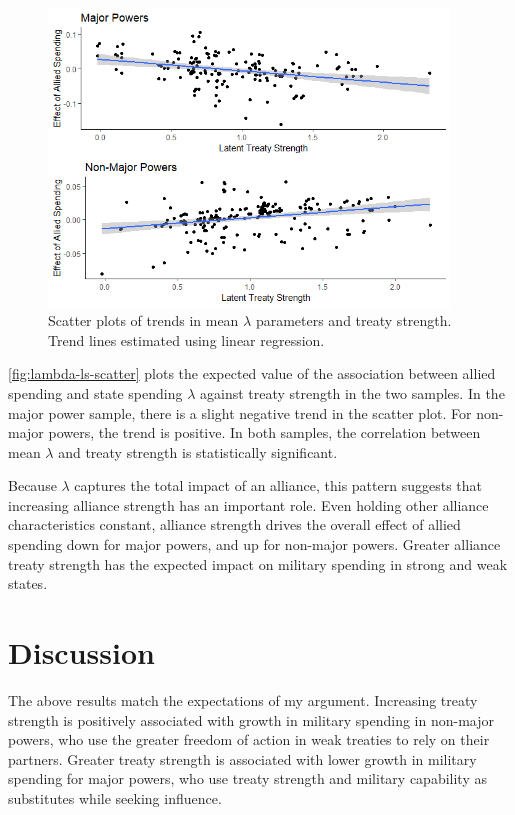 \documentclass[12pt]{article}
\begin{document}
\begin{figure}[htbp]
	\centering
		\includegraphics[width=0.95\textwidth]{../figures/lambda-ls-scatter.png}
	\caption{Scatter plots of trends in mean $\lambda$ parameters and treaty strength. Trend lines estimated using linear regression. }
	\label{fig:lambda-ls-scatter}
\end{figure}


\autoref{fig:lambda-ls-scatter} plots the expected value of the association between allied spending and state spending $\lambda$ against treaty strength in the two samples. 
In the major power sample, there is a slight negative trend in the scatter plot.
For non-major powers, the trend is positive. 
In both samples, the correlation between mean $\lambda$ and treaty strength is statistically significant. 


Because $\lambda$ captures the total impact of an alliance, this pattern suggests that increasing alliance strength has an important role. 
Even holding other alliance characteristics constant, alliance strength drives the overall effect of allied spending down for major powers, and up for non-major powers. 
Greater alliance treaty strength has the expected impact on military spending in strong and weak states. 


\section{Discussion}


The above results match the expectations of my argument. 
Increasing treaty strength is positively associated with growth in military spending in non-major powers, who use the greater freedom of action in weak treaties to rely on their partners. 
Greater treaty strength is associated with lower growth in military spending for major powers, who use treaty strength and military capability as substitutes while seeking influence. 
\end{document}
